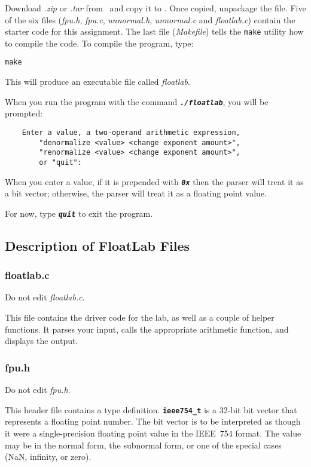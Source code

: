 Download \textit{\shortlabname.zip} or \textit{\shortlabname.tar} from \filesource\ and copy it to \runtimeenvironment.
Once copied, unpackage the file.
Five of the six files (\textit{fpu.h}, \textit{fpu.c}, \textit{unnormal.h}, \textit{unnormal.c} and \textit{floatlab.c}) contain the starter code for this assignment.
The last file (\textit{Makefile}) tells the \texttt{make} utility how to compile the code.
To compile the program, type:

\texttt{make}

This will produce an executable file called \textit{floatlab}.

When you run the program with the command \texttt{\textbf{\textit{./floatlab}}}, you will be prompted:

\begin{verbatim}
    Enter a value, a two-operand arithmetic expression,
        "denormalize <value> <change exponent amount>",
        "renormalize <value> <change exponent amount>",
        or "quit":
\end{verbatim}

When you enter a value, if it is prepended with \texttt{\textbf{\textit{0x}}} then the parser will treat it as a bit vector;
otherwise, the parser will treat it as a floating point value.

For now, type \texttt{\textbf{\textit{quit}}} to exit the program.

\subsection{Description of FloatLab Files}

\subsubsection{floatlab.c}

Do not edit \textit{floatlab.c}.

This file contains the driver code for the lab, as well as a couple of helper functions.
It parses your input, calls the appropriate arithmetic function, and displays the output.

\subsubsection{fpu.h}\label{subsubsec:fpu.h}

Do not edit \textit{fpu.h}.

This header file contains a type definition.
\textbf{\texttt{ieee754\_t}} is a 32-bit bit vector that represents a floating point number.
The bit vector is to be interpreted as though it were a single-precision floating point value in the IEEE~754 format.
The value may be in the normal form, the subnormal form, or one of the special cases (NaN, infinity, or zero).

